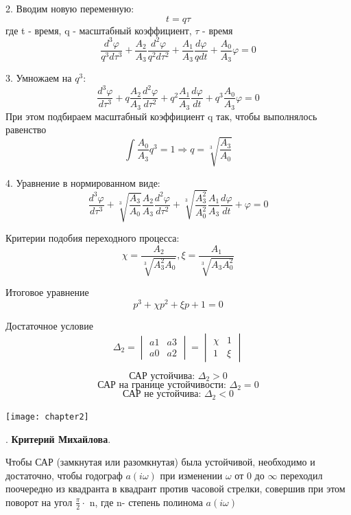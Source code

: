 \documentclass[12pt, a4paper]{report}
\begin{document}
2. Вводим новую переменную:
$$ t = q\tau $$ где t - время, q - масштабный коэффициент, $\tau$ - время
$$ \frac{d^{3}\varphi}{q^{3}d\tau^{3}} + \frac{A_{2}}{A_{3}}\frac{d^{2}\varphi}{q^{2}d\tau^{2}} + \frac{A_{1}}{A_{3}}\frac{d\varphi}{qdt} + \frac{A_{0}}{A_{3}}\varphi = 0 $$

3. Умножаем на $ q^3 $:
$$ \frac{d^{3}\varphi}{d\tau^{3}} + q\frac{A_{2}}{A_{3}}\frac{d^{2}\varphi}{d\tau^{2}} + q^{2}\frac{A_{1}}{A_{3}}\frac{d\varphi}{dt} + q^{3}\frac{A_{0}}{A_{3}}\varphi = 0 $$
При этом подбираем масштабный коэффициент q так, чтобы выполнялось равенство $$ \int{ \frac{A_{0}}{A_{3}}q^{3} } = 1 \Rightarrow q = \sqrt[3]{\frac{A_{3}}{A_{0}}} $$


4. Уравнение в нормированном виде:
$$ \frac{d^{3}\varphi}{d\tau^{3}} +
        \sqrt[3]{\frac{A_{3}}{A_{0}}}\frac{A_{2}}{A_{3}}\frac{d^{2}\varphi}{d\tau^{2}} +
        \sqrt[3]{\frac{A_{3}^{2}}{A_{0}^{2}}}\frac{A_{1}}{A_{3}}\frac{d\varphi}{dt} +
        \varphi = 0 $$

Критерии подобия переходного процесса: $$ \chi = \frac{A_{2}}{\sqrt[3]{A_{3}^2A_{0}}}, \xi = \frac{A_{1}}{\sqrt[3]{A_{3}A_{0}^2}} $$

Итоговое уравнение $$ p^{3} + \chi p^{2} + \xi p + 1 = 0 $$

Достаточное условие $$ \Delta_{2} = \begin{vmatrix}
                                         a1 &a3 \\
                                         a0 &a2
                                         \end{vmatrix} =
                                         \begin{vmatrix}
                                         \chi &1 \\
                                         1    &\xi
                                         \end{vmatrix} $$

$$ \text{САР устойчива: } \Delta_{2} > 0 $$
$$ \text{САР на границе устойчивости: } \Delta_{2} = 0 $$
$$ \text{САР не устойчива: } \Delta_{2} < 0 $$

\texttt{[image: chapter2]}

. \textbf{Критерий Михайлова}.

Чтобы САР (замкнутая или разомкнутая) была устойчивой, необходимо и достаточно, чтобы годограф $a(i\omega)$ при изменении $\omega$ от 0 до $ \infty $ переходил поочередно из квадранта в квадрант против часовой стрелки, совершив при этом поворот на угол $\frac{\pi}{2}\cdot$ n, где n- степень полинома $a(i\omega)$
\end{document}
